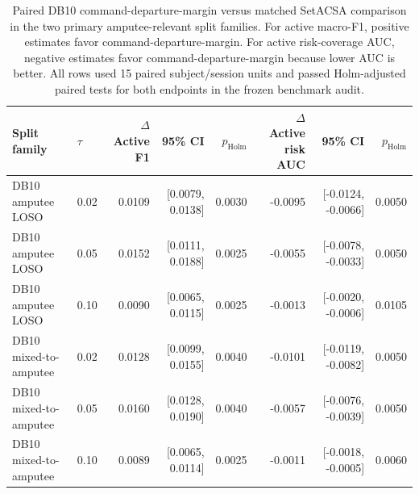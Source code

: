 \begin{table}[!t]
\centering
\caption{Paired DB10 command-departure-margin versus matched SetACSA comparison in the two primary amputee-relevant split families. For active macro-F1, positive estimates favor command-departure-margin. For active risk-coverage AUC, negative estimates favor command-departure-margin because lower AUC is better. All rows used 15 paired subject/session units and passed Holm-adjusted paired tests for both endpoints in the frozen benchmark audit.}
\label{tab:setacsa-paired}
\footnotesize
\begin{tabular}{llrrrrrr}
\toprule
Split family & $\tau$ & $\Delta$ Active F1 & 95\% CI & $p_{\mathrm{Holm}}$ & $\Delta$ Active risk AUC & 95\% CI & $p_{\mathrm{Holm}}$ \\
\midrule
DB10 amputee LOSO & 0.02 & 0.0109 & [0.0079, 0.0138] & 0.0030 & -0.0095 & [-0.0124, -0.0066] & 0.0050 \\
DB10 amputee LOSO & 0.05 & 0.0152 & [0.0111, 0.0188] & 0.0025 & -0.0055 & [-0.0078, -0.0033] & 0.0050 \\
DB10 amputee LOSO & 0.10 & 0.0090 & [0.0065, 0.0115] & 0.0025 & -0.0013 & [-0.0020, -0.0006] & 0.0105 \\
DB10 mixed-to-amputee & 0.02 & 0.0128 & [0.0099, 0.0155] & 0.0040 & -0.0101 & [-0.0119, -0.0082] & 0.0050 \\
DB10 mixed-to-amputee & 0.05 & 0.0160 & [0.0128, 0.0190] & 0.0040 & -0.0057 & [-0.0076, -0.0039] & 0.0050 \\
DB10 mixed-to-amputee & 0.10 & 0.0089 & [0.0065, 0.0114] & 0.0025 & -0.0011 & [-0.0018, -0.0005] & 0.0060 \\
\bottomrule
\end{tabular}
\end{table}

